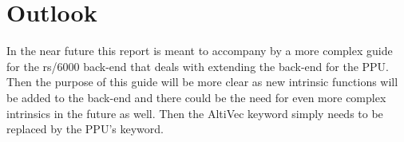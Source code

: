 \chapter{Outlook}
\label{chapter:outlook}

In the near future this report is meant to accompany by a more complex guide for the rs/6000 back-end that deals with extending the back-end for the PPU. Then the purpose of this guide will be more clear as new intrinsic functions will be added to the back-end and there could be the need for even more complex intrinsics in the future as well. Then the AltiVec keyword simply needs to be replaced by the PPU's keyword.
